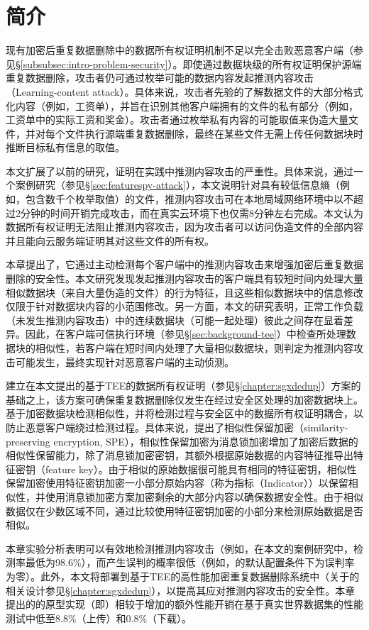 \section{简介}
\label{sec:featurespy-intro}

现有加密后重复数据删除中的数据所有权证明机制不足以完全击败恶意客户端（参见\S\ref{subsubsec:intro-problem-security}）。即使通过数据块级的所有权证明保护源端重复数据删除，攻击者仍可通过枚举可能的数据内容发起推测内容攻击（Learning-content attack）\cite{harnik2010side, zuo2018mitigating}。具体来说，攻击者先验的了解数据文件的大部分格式化内容（例如，工资单），并旨在识别其他客户端拥有的文件的私有部分（例如，工资单中的实际工资和奖金）。攻击者通过枚举私有内容的可能取值来伪造大量文件，并对每个文件执行源端重复数据删除，最终在某些文件无需上传任何数据块时推断目标私有信息的取值。

本文扩展了以前的研究\cite{harnik2010side, zuo2018mitigating}，证明在实践中推测内容攻击的严重性。具体来说，通过一个案例研究（参见\S\ref{sec:featurespy-attack}），本文说明针对具有较低信息熵（例如，包含数千个枚举取值）的文件，推测内容攻击可在本地局域网络环境中以不超过2分钟的时间开销完成攻击，而在真实云环境下也仅需8分钟左右完成。本文认为数据所有权证明无法阻止推测内容攻击，因为攻击者可以访问伪造文件的全部内容并且能向云服务端证明其对这些文件的所有权。

本章提出了\sysnameF，它通过主动检测每个客户端中的推测内容攻击来增强加密后重复数据删除的安全性。本文研究发现发起推测内容攻击的客户端具有较短时间内处理大量相似数据块（来自大量伪造的文件）的行为特征，且这些相似数据块中的信息修改仅限于针对数据块内容的小范围修改。另一方面，本文的研究表明，正常工作负载（未发生推测内容攻击）中的连续数据块（可能一起处理）彼此之间存在显着差异。因此，\sysnameF 在客户端可信执行环境（参见\S\ref{sec:background-tee}）中检查所处理数据块的相似性，若客户端在短时间内处理了大量相似数据块，则判定为推测内容攻击可能发生，最终实现针对恶意客户端的主动侦测。

\sysnameF 建立在本文提出的基于TEE的数据所有权证明（参见\S\ref{chapter:sgxdedup}）方案的基础之上，该方案可确保重复数据删除仅发生在经过安全区处理的加密数据块上。\sysnameF 基于加密数据块检测相似性，并将检测过程与安全区中的数据所有权证明耦合，以防止恶意客户端绕过检测过程。具体来说，\sysnameF 提出了相似性保留加密（similarity-preserving
encryption, SPE），相似性保留加密为消息锁加密增加了加密后数据的相似性保留能力，除了消息锁加密密钥，其额外根据原始数据的内容特征推导出特征密钥（feature key）。由于相似的原始数据很可能具有相同的特征密钥，相似性保留加密使用特征密钥加密一小部分原始内容（称为指标（Indicator））以保留相似性，并使用消息锁加密方案加密剩余的大部分内容以确保数据安全性。由于相似数据仅在少数区域不同，\sysnameF 通过比较使用特征密钥加密的小部分来检测原始数据是否相似。

本章实验分析表明\sysnameF 可以有效地检测推测内容攻击（例如，在本文的案例研究中，检测率最低为98.6\%），而产生误判的概率很低（例如，\sysnameF 的默认配置条件下为误判率为零）。此外，本文将\sysnameF 部署到基于TEE的高性能加密重复数据删除系统\sysnameS 中（关于\sysnameS 的相关设计参见\S\ref{chapter:sgxdedup}），以提高其应对推测内容攻击的安全性。本章提出的\sysnameF 的原型实现（即\prototype）相较于\sysnameS 增加的额外性能开销在基于真实世界数据集的性能测试中低至8.8\%（上传）和0.8\%（下载）。